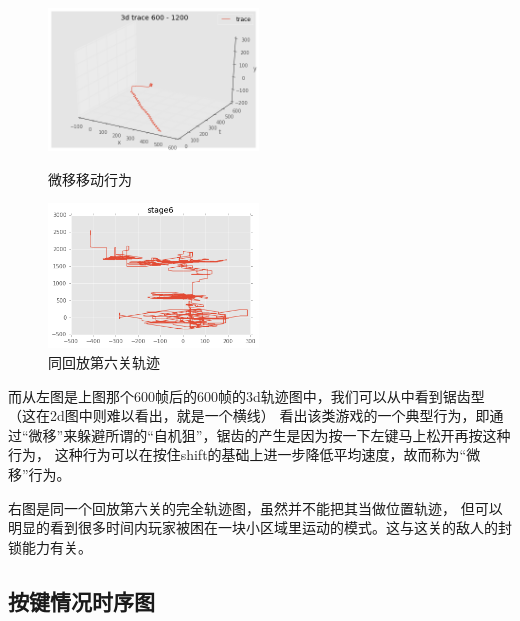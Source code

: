 \documentclass[UTF8]{ctexart}
\begin{document}
\begin{figure}[H]
\begin{minipage}[t]{0.5\linewidth}
\centering
\includegraphics[width=2.2in]{images/trace3dsm.png}
\caption{微移移动行为}
\end{minipage}%
\begin{minipage}[t]{0.5\linewidth}
\centering
\includegraphics[width=2.2in]{images/trace2dstage6.png}
\caption{同回放第六关轨迹}
\end{minipage}
\end{figure}

而从左图是上图那个600帧后的600帧的3d轨迹图中，我们可以从中看到锯齿型（这在2d图中则难以看出，就是一个横线）
看出该类游戏的一个典型行为，即通过“微移”来躲避所谓的“自机狙”，锯齿的产生是因为按一下左键马上松开再按这种行为，
这种行为可以在按住shift的基础上进一步降低平均速度，故而称为“微移”行为。

右图是同一个回放第六关的完全轨迹图，虽然并不能把其当做位置轨迹，
但可以明显的看到很多时间内玩家被困在一块小区域里运动的模式。这与这关的敌人的封锁能力有关。

\subsection{按键情况时序图}
\end{document}
